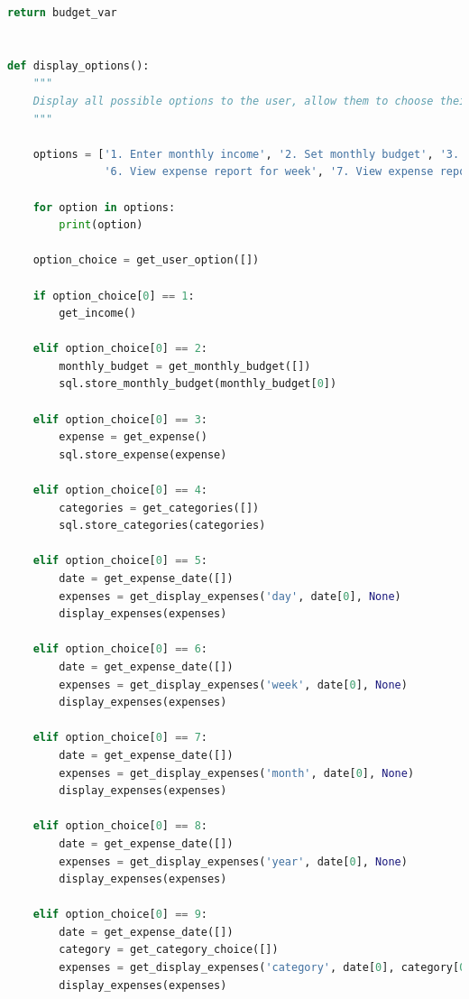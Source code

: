 \documentclass[11pt]{article}
\begin{document}
\begin{lstlisting}[language=Python, caption=Source code for \textit{expcli.py}.]
    return budget_var


def display_options():
    """
    Display all possible options to the user, allow them to choose their desired option and then direct program flow towards that desired option. For instance, if option 1 is selected, a method to allow the user to enter monthly income will be called.
    """

    options = ['1. Enter monthly income', '2. Set monthly budget', '3. Enter expense', '4. Add expense category', '5. View expense report for day',
               '6. View expense report for week', '7. View expense report for month', '8. View expense report for year', '9. View expense report for category', '10. Export expense report to pdf', '11. Export expense report to csv', '12. Exit\n']

    for option in options:
        print(option)

    option_choice = get_user_option([])

    if option_choice[0] == 1:
        get_income()

    elif option_choice[0] == 2:
        monthly_budget = get_monthly_budget([])
        sql.store_monthly_budget(monthly_budget[0])

    elif option_choice[0] == 3:
        expense = get_expense()
        sql.store_expense(expense)

    elif option_choice[0] == 4:
        categories = get_categories([])
        sql.store_categories(categories)

    elif option_choice[0] == 5:
        date = get_expense_date([])
        expenses = get_display_expenses('day', date[0], None)
        display_expenses(expenses)

    elif option_choice[0] == 6:
        date = get_expense_date([])
        expenses = get_display_expenses('week', date[0], None)
        display_expenses(expenses)

    elif option_choice[0] == 7:
        date = get_expense_date([])
        expenses = get_display_expenses('month', date[0], None)
        display_expenses(expenses)

    elif option_choice[0] == 8:
        date = get_expense_date([])
        expenses = get_display_expenses('year', date[0], None)
        display_expenses(expenses)

    elif option_choice[0] == 9:
        date = get_expense_date([])
        category = get_category_choice([])
        expenses = get_display_expenses('category', date[0], category[0])
        display_expenses(expenses)


\end{lstlisting}
\end{document}

